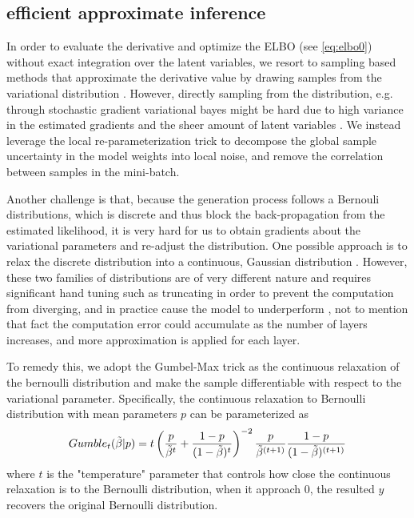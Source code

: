 \subsection{efficient approximate inference}\label{sec:approximate-inference}


In order to evaluate the derivative and optimize the ELBO (see \autoref{eq:elbo0}) without exact integration over the latent variables, 
we resort to sampling based methods 
that approximate the derivative value by drawing samples from the variational distribution \cite{ranganath2014black}. 
However, directly sampling from the distribution, e.g. through stochastic gradient variational bayes  \cite{rezende2014stochastic} might be hard due to high variance in the estimated gradients and the sheer amount of latent variables \cite{kingma2015variational}.
We instead leverage the local re-parameterization trick \citep{Kingma2015} to  
decompose the global sample uncertainty in the model weights into local noise, and remove the correlation between samples in the mini-batch.

Another challenge is that, because the generation process follows a Bernouli distributions, 
which is discrete and thus block the back-propagation from the estimated likelihood, 
it is very hard for us to obtain gradients about the variational parameters and re-adjust the distribution. 
One possible approach is to relax the discrete distribution into a continuous, Gaussian distribution \cite{wang2013fast, chen2019large}. However, these two families of distributions are of very different nature and 
requires significant hand tuning such as truncating in order  to prevent the computation from diverging, and in practice cause the model to underperform \cite{molchanov2016dropout}, not to mention that fact the computation error could accumulate as the number of layers increases, and more  approximation is applied for each layer. 

To remedy this, we adopt the Gumbel-Max trick \cite{gumbel1954statistical, gummaddison2014sampling} as the continuous relaxation of the bernoulli distribution
and %
make the sample differentiable with respect to the variational parameter. 
Specifically, the continuous relaxation to Bernoulli distribution with mean parameters $p$ can be parameterized as
\begin{equation}
Gumble_{t}( \tilde{\beta} | p) = t \left( \frac{p}{\tilde{\beta}^t} + \frac{1 - p}{(1- \tilde{\beta})^t} \right)^{-2} 
\frac{p}{\tilde{\beta}^{(t + 1)}} \frac{1 - p}{(1 - \tilde{\beta})^{(t + 1)}}  
\\
\end{equation}
where $t$ is the "temperature" parameter that controls how close the continuous relaxation is to the Bernoulli distribution, when it approach 0, the resulted $y$ recovers the original Bernoulli distribution.

